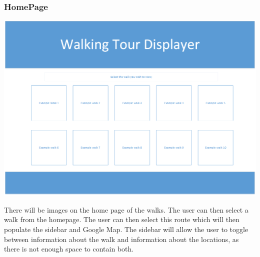 \documentclass{project}
\begin{document}
\subsubsection{HomePage}
\begin{figure}[H]
\end{figure}
\bigskip
\includegraphics{WebUI2a}
\bigskip

There will be images on the home page of the walks. The user can then select a walk from the homepage. The user can then select this route which will then populate the sidebar and Google Map. 
The sidebar will allow the user to toggle between information about the walk and information about the locations, as there is not enough space to contain both.
\clearpage
\end{document}

